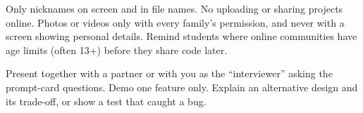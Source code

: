 \documentclass[level=3,teacher]{kidscode}
\begin{document}
\begin{safety}
Only nicknames on screen and in file names. No uploading or sharing projects online. Photos or
videos only with every family's permission, and never with a screen showing personal details.
Remind students where online communities have age limits (often 13+) before they share code later.
\end{safety}

\begin{differentiation}
\supportpath Present together with a partner or with you as the \enquote{interviewer} asking the
prompt-card questions. Demo one feature only.
\extensionpath Explain an alternative design and its trade-off, or show a test that caught a bug.
\end{differentiation}
\end{document}
